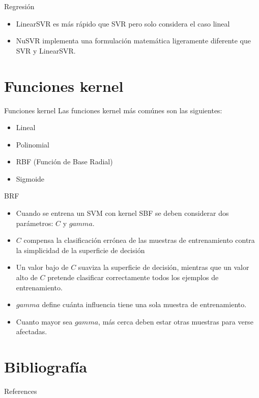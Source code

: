\documentclass[11pt,aspectratio=169]{beamer}
\begin{document}
\begin{frame}{Regresión}
  \begin{itemize}
    \item LinearSVR es más rápido que SVR pero solo considera el caso lineal \pause 
    \item NuSVR implementa una formulación matemática ligeramente diferente que SVR y LinearSVR.
  \end{itemize}
\end{frame}


\section{Funciones kernel}
\begin{frame}{Funciones kernel}
  Las funciones kernel más comúnes son las siguientes:\pause
  \begin{itemize}
    \item Lineal \pause
    \item Polinomial \pause
    \item RBF (Función de Base Radial)\pause
    \item Sigmoide
  \end{itemize}
\end{frame}

\begin{frame}{BRF}
	\begin{itemize}
		\item Cuando se entrena un SVM con kernel SBF se deben considerar dos parámetros: $C$ y $gamma$. \pause
		\item $C$ compensa la clasificación errónea de las muestras de entrenamiento contra la simplicidad 
			de la superficie de decisión\pause
		\item Un valor bajo de $C$ suaviza la superficie de decisión, mientras que un valor alto de $C$ pretende clasificar 
			correctamente todos los ejemplos de entrenamiento.\pause
		\item $gamma$ define cuánta influencia tiene una sola muestra de entrenamiento.\pause
		\item Cuanto mayor sea $gamma$, más cerca deben estar otras muestras para verse afectadas.
	\end{itemize}
\end{frame}

\section{Bibliografía}
\begin{frame}[allowframebreaks]{References}
    \nocite{*}
    
    
\end{frame}
\end{document}
